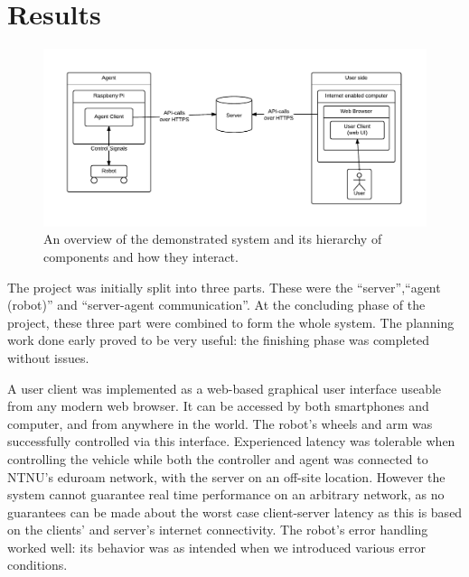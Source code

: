 \chapter{Results}
\begin{figure}[H]
\centering
\includegraphics[width=\textwidth]{graphics/robot-implementation.pdf}
\caption{An overview of the demonstrated system and its hierarchy of components and how they interact.}
\label{fig:robot-implementation}
\end{figure}


The project was initially split into three parts.
These were the ``server'',``agent (robot)'' and ``server-agent communication''. 
At the concluding phase of the project, these three part were combined to form the whole system.
The planning work done early proved to be very useful: the finishing phase was completed without issues.

A user client was implemented as a web-based graphical user interface useable from any modern web browser.
It can be accessed by both smartphones and computer, and from anywhere in the world. 
The robot's wheels and arm was successfully controlled via this interface.
Experienced latency was tolerable when controlling the vehicle while both the controller and agent was connected to NTNU's eduroam network, with the server on an off-site location.
However the system cannot guarantee real time performance on an arbitrary network, as no guarantees can be made about the worst case client-server latency as this is based on the clients' and server's internet connectivity.
The robot's error handling worked well: its behavior was as intended when we introduced various error conditions.

